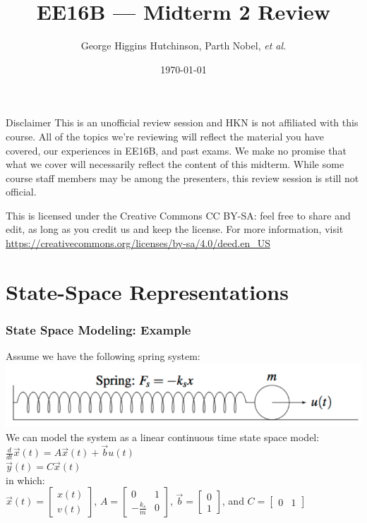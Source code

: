 \documentclass{beamer}
\title{EE16B --- Midterm 2 Review}
\author{George Higgins Hutchinson, Parth Nobel, \textit{et al.}}
\date{\today}
\begin{document}
	\begin{frame}
		\titlepage
	\end{frame}

	\begin{frame}{Disclaimer}
	This is an unofficial review session and HKN is not affiliated with this course. All of the topics we're reviewing will reflect the material you have covered, our experiences in EE16B, and past exams. We make no promise that what we cover will necessarily reflect the content of this midterm. While some course staff members may be among the presenters, this review session is still not official.
	\vspace{1em}
	
	This is licensed under the Creative Commons CC BY-SA: feel free to share and edit, as long as you credit us and keep the license. For more information, visit \\ \small{\url{https://creativecommons.org/licenses/by-sa/4.0/deed.en_US}}
	
	\end{frame}

	\section[State-Space]{State-Space Representations}

\begin{frame}
\frametitle{State Space Modeling: Example}

Assume we have the following spring system: \\
\includegraphics[scale=0.5]{./images/spring.png} \\ \pause
We can model the system as a linear continuous time state space model: \\
$\frac{d}{dt}\vec{x}(t) = A\vec{x}(t) + \vec{b}u(t)$ \\
$\vec{y}(t) = C\vec{x}(t)$ \\
in which: \\
$\vec{x}(t) = 
\begin{bmatrix}
x(t) \\
v(t)
\end{bmatrix}$, 
$A = 
\begin{bmatrix}
0 & 1 \\
-\frac{k_{s}}{m} & 0
\end{bmatrix}$, 
$\vec{b} = 
\begin{bmatrix}
0 \\
1
\end{bmatrix}$, and
$C = 
\begin{bmatrix}
0 & 1
\end{bmatrix}$
\end{frame}
\end{document}
